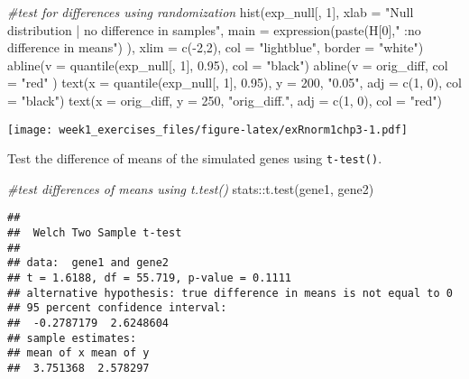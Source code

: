 \documentclass[
]{article}
\newenvironment{Shaded}{\begin{snugshade}}{\end{snugshade}}
\newcommand{\AttributeTok}[1]{\textcolor[rgb]{0.77,0.63,0.00}{#1}}
\newcommand{\CommentTok}[1]{\textcolor[rgb]{0.56,0.35,0.01}{\textit{#1}}}
\newcommand{\DecValTok}[1]{\textcolor[rgb]{0.00,0.00,0.81}{#1}}
\newcommand{\FloatTok}[1]{\textcolor[rgb]{0.00,0.00,0.81}{#1}}
\newcommand{\FunctionTok}[1]{\textcolor[rgb]{0.00,0.00,0.00}{#1}}
\newcommand{\NormalTok}[1]{#1}
\newcommand{\SpecialCharTok}[1]{\textcolor[rgb]{0.00,0.00,0.00}{#1}}
\newcommand{\StringTok}[1]{\textcolor[rgb]{0.31,0.60,0.02}{#1}}
\begin{document}
\begin{Shaded}
\begin{Highlighting}[]
\CommentTok{\#test for differences using randomization}
\FunctionTok{hist}\NormalTok{(exp\_null[, }\DecValTok{1}\NormalTok{], }\AttributeTok{xlab =} \StringTok{"Null distribution | no difference in samples"}\NormalTok{,}
     \AttributeTok{main =} \FunctionTok{expression}\NormalTok{(}\FunctionTok{paste}\NormalTok{(H[}\DecValTok{0}\NormalTok{],}\StringTok{" :no difference in means"}\NormalTok{) ),}
     \AttributeTok{xlim =} \FunctionTok{c}\NormalTok{(}\SpecialCharTok{{-}}\DecValTok{2}\NormalTok{,}\DecValTok{2}\NormalTok{), }\AttributeTok{col =} \StringTok{"lightblue"}\NormalTok{, }\AttributeTok{border =} \StringTok{"white"}\NormalTok{)}
\FunctionTok{abline}\NormalTok{(}\AttributeTok{v =} \FunctionTok{quantile}\NormalTok{(exp\_null[, }\DecValTok{1}\NormalTok{], }\FloatTok{0.95}\NormalTok{), }\AttributeTok{col =} \StringTok{"black"}\NormalTok{)}
\FunctionTok{abline}\NormalTok{(}\AttributeTok{v =}\NormalTok{ orig\_diff, }\AttributeTok{col =} \StringTok{"red"}\NormalTok{ )}
\FunctionTok{text}\NormalTok{(}\AttributeTok{x =} \FunctionTok{quantile}\NormalTok{(exp\_null[, }\DecValTok{1}\NormalTok{], }\FloatTok{0.95}\NormalTok{), }\AttributeTok{y =} \DecValTok{200}\NormalTok{, }\StringTok{"0.05"}\NormalTok{, }\AttributeTok{adj =} \FunctionTok{c}\NormalTok{(}\DecValTok{1}\NormalTok{, }\DecValTok{0}\NormalTok{), }\AttributeTok{col =} \StringTok{"black"}\NormalTok{)}
\FunctionTok{text}\NormalTok{(}\AttributeTok{x =}\NormalTok{ orig\_diff, }\AttributeTok{y =} \DecValTok{250}\NormalTok{, }\StringTok{"orig\_diff."}\NormalTok{, }\AttributeTok{adj =} \FunctionTok{c}\NormalTok{(}\DecValTok{1}\NormalTok{, }\DecValTok{0}\NormalTok{), }\AttributeTok{col =} \StringTok{"red"}\NormalTok{)}
\end{Highlighting}
\end{Shaded}

\texttt{[image: week1\_exercises\_files/figure-latex/exRnorm1chp3-1.pdf]}

Test the difference of means of the simulated genes using
\texttt{t-test()}.

\begin{Shaded}
\begin{Highlighting}[]
\CommentTok{\#test differences of means using \textquotesingle{}t.test()\textquotesingle{}}
\NormalTok{stats}\SpecialCharTok{::}\FunctionTok{t.test}\NormalTok{(gene1, gene2)}
\end{Highlighting}
\end{Shaded}

\begin{verbatim}
## 
##  Welch Two Sample t-test
## 
## data:  gene1 and gene2
## t = 1.6188, df = 55.719, p-value = 0.1111
## alternative hypothesis: true difference in means is not equal to 0
## 95 percent confidence interval:
##  -0.2787179  2.6248604
## sample estimates:
## mean of x mean of y 
##  3.751368  2.578297
\end{verbatim}
\end{document}
